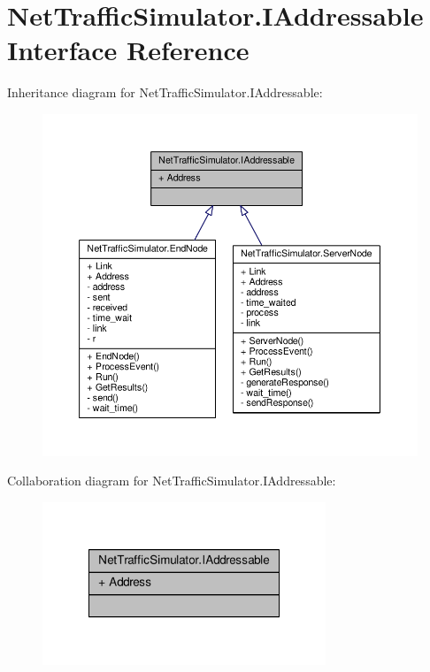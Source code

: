 \hypertarget{interfaceNetTrafficSimulator_1_1IAddressable}{\section{Net\-Traffic\-Simulator.\-I\-Addressable Interface Reference}
\label{interfaceNetTrafficSimulator_1_1IAddressable}
}


Inheritance diagram for Net\-Traffic\-Simulator.\-I\-Addressable\-:
\nopagebreak
\begin{figure}[H]
\begin{center}
\leavevmode
\includegraphics[width=350pt]{interfaceNetTrafficSimulator_1_1IAddressable__inherit__graph}
\end{center}
\end{figure}


Collaboration diagram for Net\-Traffic\-Simulator.\-I\-Addressable\-:\nopagebreak
\begin{figure}[H]
\begin{center}
\leavevmode
\includegraphics[width=240pt]{interfaceNetTrafficSimulator_1_1IAddressable__coll__graph}
\end{center}
\end{figure}
